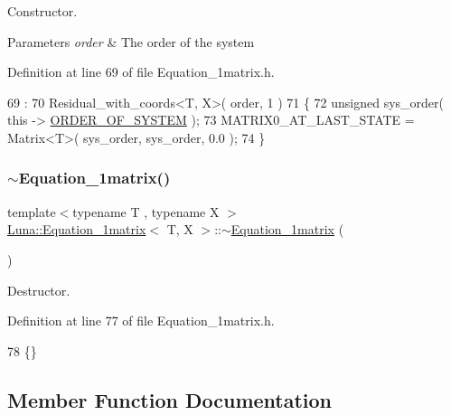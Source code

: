 Constructor. 


\begin{DoxyParams}{Parameters}
{\em order} & The order of the system \\
\hline
\end{DoxyParams}


Definition at line 69 of file Equation\+\_\+1matrix.\+h.


\begin{DoxyCode}
69                                                                  :
70        Residual\_with\_coords<T, X>( order, 1 )
71  \{
72    \textcolor{keywordtype}{unsigned} sys\_order( \textcolor{keyword}{this} -> \hyperlink{classLuna_1_1Residual_a7facf1267eb277d84aeea8beba2cb200}{ORDER\_OF\_SYSTEM} );
73    MATRIX0\_AT\_LAST\_STATE = Matrix<T>( sys\_order, sys\_order, 0.0 );
74  \}
\end{DoxyCode}
\mbox{\label{classLuna_1_1Equation__1matrix_a5f6241862fa31bb048be2e535df3eb94}} 
\subsubsection{\texorpdfstring{$\sim$\+Equation\+\_\+1matrix()}{~Equation\_1matrix()}}
{\footnotesize\ttfamily template$<$typename T , typename X $>$ \\
\hyperlink{classLuna_1_1Equation__1matrix}{Luna\+::\+Equation\+\_\+1matrix}$<$ T, X $>$\+::$\sim$\hyperlink{classLuna_1_1Equation__1matrix}{Equation\+\_\+1matrix} (\begin{DoxyParamCaption}{ }\end{DoxyParamCaption})\hspace{0.3cm}{\ttfamily [virtual]}}



Destructor. 



Definition at line 77 of file Equation\+\_\+1matrix.\+h.


\begin{DoxyCode}
78  \{\}
\end{DoxyCode}


\subsection{Member Function Documentation}
\mbox{\label{classLuna_1_1Equation__1matrix_ad2ddee223f6c9dfd0c95a867699bbd24}} 
